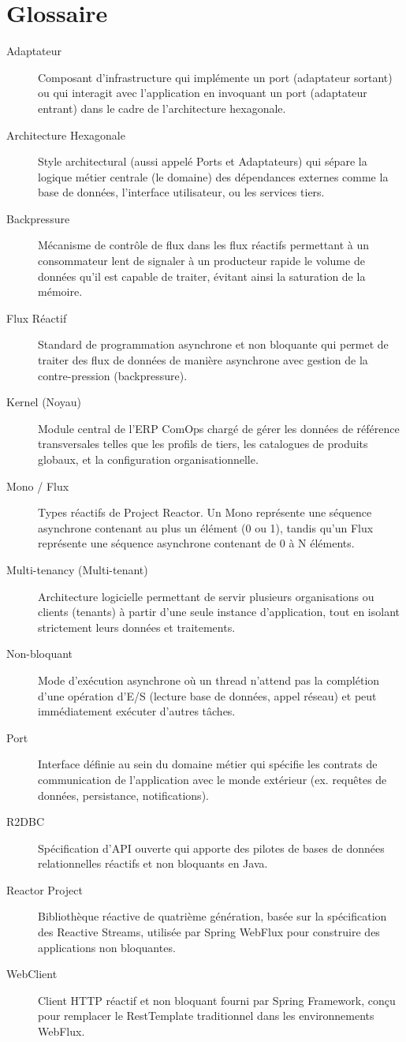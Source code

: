 \chapter*{Glossaire}

\begin{description}
    \item[Adaptateur] Composant d'infrastructure qui implémente un port (adaptateur sortant) ou qui interagit avec l'application en invoquant un port (adaptateur entrant) dans le cadre de l'architecture hexagonale.
    \item[Architecture Hexagonale] Style architectural (aussi appelé Ports et Adaptateurs) qui sépare la logique métier centrale (le domaine) des dépendances externes comme la base de données, l'interface utilisateur, ou les services tiers.
    \item[Backpressure] Mécanisme de contrôle de flux dans les flux réactifs permettant à un consommateur lent de signaler à un producteur rapide le volume de données qu'il est capable de traiter, évitant ainsi la saturation de la mémoire.
    \item[Flux Réactif] Standard de programmation asynchrone et non bloquante qui permet de traiter des flux de données de manière asynchrone avec gestion de la contre-pression (backpressure).
    \item[Kernel (Noyau)] Module central de l'ERP ComOps chargé de gérer les données de référence transversales telles que les profils de tiers, les catalogues de produits globaux, et la configuration organisationnelle.
    \item[Mono / Flux] Types réactifs de Project Reactor. Un Mono représente une séquence asynchrone contenant au plus un élément (0 ou 1), tandis qu'un Flux représente une séquence asynchrone contenant de 0 à N éléments.
    \item[Multi-tenancy (Multi-tenant)] Architecture logicielle permettant de servir plusieurs organisations ou clients (tenants) à partir d'une seule instance d'application, tout en isolant strictement leurs données et traitements.
    \item[Non-bloquant] Mode d'exécution asynchrone où un thread n'attend pas la complétion d'une opération d'E/S (lecture base de données, appel réseau) et peut immédiatement exécuter d'autres tâches.
    \item[Port] Interface définie au sein du domaine métier qui spécifie les contrats de communication de l'application avec le monde extérieur (ex. requêtes de données, persistance, notifications).
    \item[R2DBC] Spécification d'API ouverte qui apporte des pilotes de bases de données relationnelles réactifs et non bloquants en Java.
    \item[Reactor Project] Bibliothèque réactive de quatrième génération, basée sur la spécification des Reactive Streams, utilisée par Spring WebFlux pour construire des applications non bloquantes.
    \item[WebClient] Client HTTP réactif et non bloquant fourni par Spring Framework, conçu pour remplacer le RestTemplate traditionnel dans les environnements WebFlux.
\end{description}

